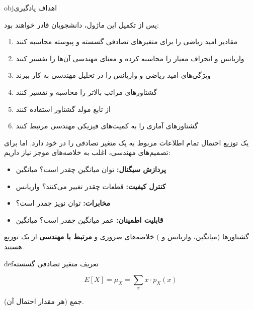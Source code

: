 \begin{PSbox}[unbreakable]{obj}{اهداف یادگیری}

پس از تکمیل این ماژول، دانشجویان قادر خواهند بود:

\begin{enumerate}
\def\labelenumi{\arabic{enumi}.}
\tightlist
\item
  مقادیر امید ریاضی را برای متغیرهای تصادفی گسسته و پیوسته محاسبه کنند
\item
  واریانس و انحراف معیار را محاسبه کرده و معنای مهندسی آن‌ها را تفسیر کنند
\item
  ویژگی‌های امید ریاضی و واریانس را در تحلیل مهندسی به کار ببرند
\item
  گشتاورهای مراتب بالاتر را محاسبه و تفسیر کنند
\item
  از تابع مولد گشتاور  استفاده کنند
\item
  گشتاورهای آماری را به کمیت‌های فیزیکی مهندسی مرتبط کنند
\end{enumerate}

\end{PSbox}



یک توزیع احتمال تمام اطلاعات مربوط به یک متغیر تصادفی را در خود دارد. اما برای تصمیم‌های مهندسی، اغلب به خلاصه‌های موجز نیاز داریم:

\begin{itemize}
\tightlist
\item
  \textbf{پردازش سیگنال:} توان میانگین چقدر است؟ \lr{\ensuremath{\to}} میانگین 
\item
  \textbf{کنترل کیفیت:} قطعات چقدر تغییر می‌کنند؟ \lr{\ensuremath{\to}} واریانس
\item
  \textbf{مخابرات:} توان نویز چقدر است؟ 
\item
  \textbf{قابلیت اطمینان:} عمر میانگین چقدر است؟ \lr{\ensuremath{\to}} میانگین
\end{itemize}

گشتاورها (میانگین، واریانس و ) خلاصه‌های ضروری و \textbf{مرتبط با مهندسی} از یک توزیع هستند.


\begin{PSbox}[unbreakable]{def}{تعریف  متغیر تصادفی گسسته}

\[E[X] = \mu_X = \sum_{x} x \cdot p_X(x)\]

جمع (هر مقدار \lr{\ensuremath{\times}} احتمال آن).

\end{PSbox}

